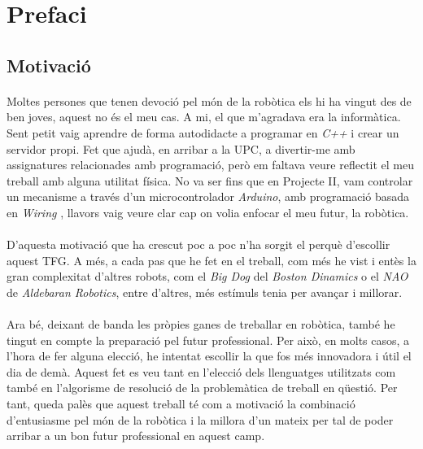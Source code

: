 \documentclass[12pt,a4paper,final,twoside]{article}
\begin{document}
\tableofcontents
\newpage
\listoffigures
\newpage
\listoftables
\newpage



\section*{Prefaci}
\subsection*{Motivació}

\paragraph{}Moltes persones que tenen devoció pel món de la robòtica els hi ha vingut des de ben joves, aquest no és el meu cas. A mi, el que m'agradava era la informàtica. Sent petit vaig aprendre de forma autodidacte a programar en \textit{C++} i crear un servidor propi. Fet que ajudà, en arribar a la UPC, a divertir-me amb assignatures relacionades amb programació, però em faltava veure reflectit el meu treball amb alguna utilitat física. No va ser fins que en Projecte II, vam controlar un mecanisme a través d'un microcontrolador \textit{Arduino}, amb programació basada en \textit{Wiring} \cite{Arduino}, llavors vaig veure clar cap on volia enfocar el meu futur, la robòtica.

\paragraph{}D'aquesta motivació que ha crescut poc a poc n'ha sorgit el perquè d'escollir aquest TFG. A més, a cada pas que he fet en el treball, com més he vist i entès la gran complexitat d'altres robots, com el \textit{Big Dog} del \textit{Boston Dinamics} o el \textit{NAO} de \textit{Aldebaran Robotics}, entre d'altres, més estímuls tenia per avançar i millorar.

\paragraph{}Ara bé, deixant de banda les pròpies ganes de treballar en robòtica, també he tingut en compte la preparació pel futur professional. Per això, en molts casos, a l'hora de fer alguna elecció, he intentat escollir la que fos més innovadora i útil el dia de demà. Aquest fet es veu tant en l'elecció dels llenguatges utilitzats com també en l'algorisme de resolució de la problemàtica de treball en qüestió. Per tant, queda palès que aquest treball té com a motivació la combinació d'entusiasme pel món de la robòtica i la millora d'un mateix per tal de poder arribar a un bon futur professional en aquest camp.
\end{document}
